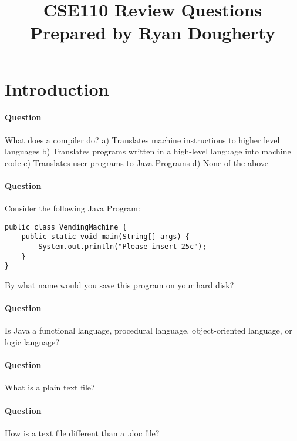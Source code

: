 \documentclass{article}
\date{}
\begin{document}
\title{\textbf{CSE110 Review Questions \\
Prepared by Ryan Dougherty}}
\maketitle

\section*{Introduction}
\setcounter{question_num}{1}
\paragraph{Question }
What does a compiler do?
\newline a) Translates machine instructions to higher level languages
\newline b) Translates programs written in a high-level language into machine code
\newline c) Translates user programs to Java Programs
\newline d) None of the above

\addtocounter{question_num}{1}
\paragraph{Question }
Consider the following Java Program:
\begin{lstlisting}
public class VendingMachine {
	public static void main(String[] args) {
		System.out.println("Please insert 25c");
	}
}
\end{lstlisting}
By what name would you save this program on your hard disk?

\addtocounter{question_num}{1}
\paragraph{Question }
Is Java a functional language, procedural language, object-oriented language, or logic language?

\addtocounter{question_num}{1}
\paragraph{Question }
What is a plain text file?

\addtocounter{question_num}{1}
\paragraph{Question }
How is a text file different than a .doc file?
\end{document}
